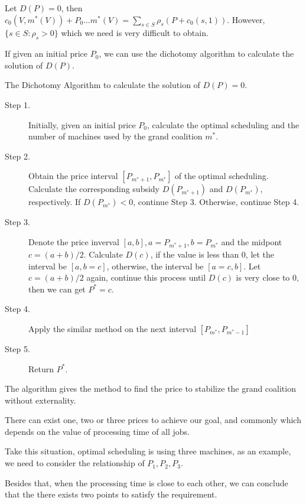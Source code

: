 Let $D(P) = 0$, then $c_0(V, m^*(V)) + P_0 \dots m^*(V) = \sum_{s \in S} \rho_s (P + c_0(s,1))$. However, $\{s\in S: \rho_s > 0\}$ which we need is very difficult to obtain.

If given an initial price $P_0$, we can use the dichotomy algorithm to calculate the solution of $D(P)$.

\begin{algorithm}[H]\label{algoDI}
\caption{The Dichotomy Algorithm to calculate the solution of $D(P)=0$.}
\begin{algorithmic}[1]
\begin{description}
  \item[Step 1.] Initially, given an initial price $P_0$, calculate the optimal scheduling and the number of machines used by the grand coalition $m^*$. \\
  \vspace{10pt}
  \item[Step 2.] Obtain the price interval $[P_{m^*+1},P_{m^*}]$ of the optimal scheduling. Calculate the corresponding subsidy $D(P_{m^*+1})$ and $D(P_{m^*})$, respectively. If $D(P_{m^*}) < 0$, continue Step 3. Otherwise, continue Step 4.
	\vspace{10pt}
  \item[Step 3.] Denote the price inverval $[a,b], a = P_{m^*+1}, b= P_{m^*}$ and the midpont $c =(a+b)/2$. Calculate $D(c)$, if the value is less than 0, let the interval be $[a, b=c]$, otherwise, the interval be $[a=c, b]$. Let $c =(a+b)/2$ again,
	continue this process until $D(c)$ is very close to 0, then we can get $P^{*} = c$.
  \item[Step 4.] Apply the similar method on the next interval $[P_{m^*},P_{m^*-1}]$
  \item[Step 5.] Return $P^{*}$.
\end{description}
\end{algorithmic}
\end{algorithm}

The algorithm gives the method to find the price to stabilize the grand coalition without externality.

There can exist one, two or three prices to achieve our goal, and commonly which depends on the value of processing time of all jobs.

Take this situation, optimal scheduling is using three machines, as an example, we need to consider the relationship of $P_1,P_2, P_3$.

Besides that, when the processing time is close to each other, we can conclude that the there exists two points to satisfy the requirement.
